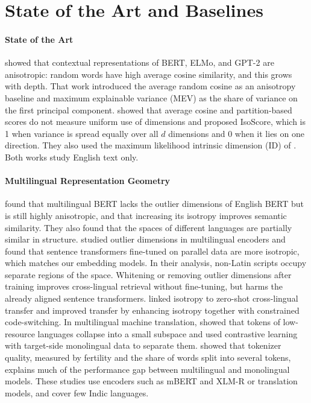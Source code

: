 \section{State of the Art and Baselines}
\label{sec:app1_baselines_sota}

\paragraph{State of the Art}
\citet{ethayarajh-2019-contextual} showed that contextual representations of BERT, ELMo, and GPT-2 are anisotropic: random words have high average cosine similarity, and this grows with depth. That work introduced the average random cosine as an anisotropy baseline and maximum explainable variance (MEV) as the share of variance on the first principal component. \citet{rudman-etal-2022-isoscore} showed that average cosine and partition-based scores do not measure uniform use of dimensions and proposed IsoScore, which is 1 when variance is spread equally over all $d$ dimensions and 0 when it lies on one direction. They also used the maximum likelihood intrinsic dimension (ID) of \citet{levina-bickel-2004-maximum}. Both works study English text only.

\paragraph{Multilingual Representation Geometry}
\citet{rajaee-pilehvar-2022-isotropy} found that multilingual BERT lacks the outlier dimensions of English BERT but is still highly anisotropic, and that increasing its isotropy improves semantic similarity. They also found that the spaces of different languages are partially similar in structure. \citet{hammerl-etal-2023-exploring} studied outlier dimensions in multilingual encoders and found that sentence transformers fine-tuned on parallel data are more isotropic, which matches our embedding models. In their analysis, non-Latin scripts occupy separate regions of the space. Whitening or removing outlier dimensions after training improves cross-lingual retrieval without fine-tuning, but harms the already aligned sentence transformers. \citet{ji-etal-2023-isotropic} linked isotropy to zero-shot cross-lingual transfer and improved transfer by enhancing isotropy together with constrained code-switching. In multilingual machine translation, \citet{lai-etal-2023-mitigating} showed that tokens of low-resource languages collapse into a small subspace and used contrastive learning with target-side monolingual data to separate them. \citet{rust-etal-2021-good} showed that tokenizer quality, measured by fertility and the share of words split into several tokens, explains much of the performance gap between multilingual and monolingual models. These studies use encoders such as mBERT and XLM-R or translation models, and cover few Indic languages. 



